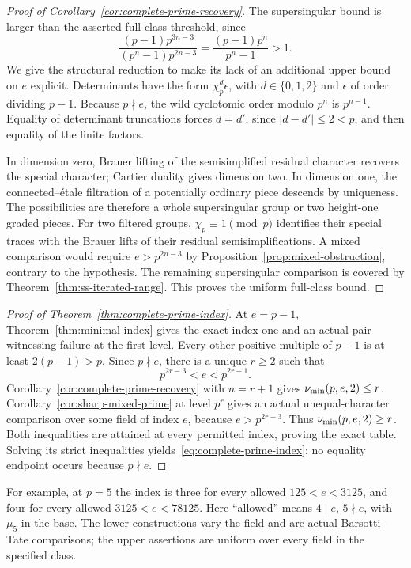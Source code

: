 \begin{proof}[Proof of Corollary~\ref{cor:complete-prime-recovery}]
The supersingular bound is larger than the asserted full-class threshold, since
\[
 \frac{(p-1)p^{3n-3}}{(p^n-1)p^{2n-3}}
 =\frac{(p-1)p^n}{p^n-1}>1.
\]
We give the structural reduction to make its lack of an additional upper bound on $e$ explicit. Determinants have the form $\chi_p^d\epsilon$, with $d\in\{0,1,2\}$ and $\epsilon$ of order dividing $p-1$. Because $p\nmid e$, the wild cyclotomic order modulo $p^n$ is $p^{n-1}$. Equality of determinant truncations forces $d=d'$, since $|d-d'|\le2<p$, and then equality of the finite factors.

In dimension zero, Brauer lifting of the semisimplified residual character recovers the special character; Cartier duality gives dimension two. In dimension one, the connected--\'etale filtration of a potentially ordinary piece descends by uniqueness. The possibilities are therefore a whole supersingular group or two height-one graded pieces. For two filtered groups, $\chi_p\equiv1\pmod p$ identifies their special traces with the Brauer lifts of their residual semisimplifications. A mixed comparison would require $e>p^{2n-3}$ by Proposition~\ref{prop:mixed-obstruction}, contrary to the hypothesis. The remaining supersingular comparison is covered by Theorem~\ref{thm:ss-iterated-range}. This proves the uniform full-class bound.
\end{proof}

\begin{proof}[Proof of Theorem~\ref{thm:complete-prime-index}]
At $e=p-1$, Theorem~\ref{thm:minimal-index} gives the exact index one and an actual pair witnessing failure at the first level. Every other positive multiple of $p-1$ is at least $2(p-1)>p$. Since $p\nmid e$, there is a unique $r\ge2$ such that
\[
 p^{2r-3}<e<p^{2r-1}.
\]
Corollary~\ref{cor:complete-prime-recovery} with $n=r+1$ gives $\nu_{\min}(p,e,2)\le r$. Corollary~\ref{cor:sharp-mixed-prime} at level $p^r$ gives an actual unequal-character comparison over some field of index $e$, because $e>p^{2r-3}$. Thus $\nu_{\min}(p,e,2)\ge r$. Both inequalities are attained at every permitted index, proving the exact table. Solving its strict inequalities yields~\eqref{eq:complete-prime-index}; no equality endpoint occurs because $p\nmid e$.
\end{proof}

For example, at $p=5$ the index is three for every allowed $125<e<3125$, and four for every allowed $3125<e<78125$. Here ``allowed'' means $4\mid e$, $5\nmid e$, with $\mu_5$ in the base. The lower constructions vary the field and are actual Barsotti--Tate comparisons; the upper assertions are uniform over every field in the specified class.
